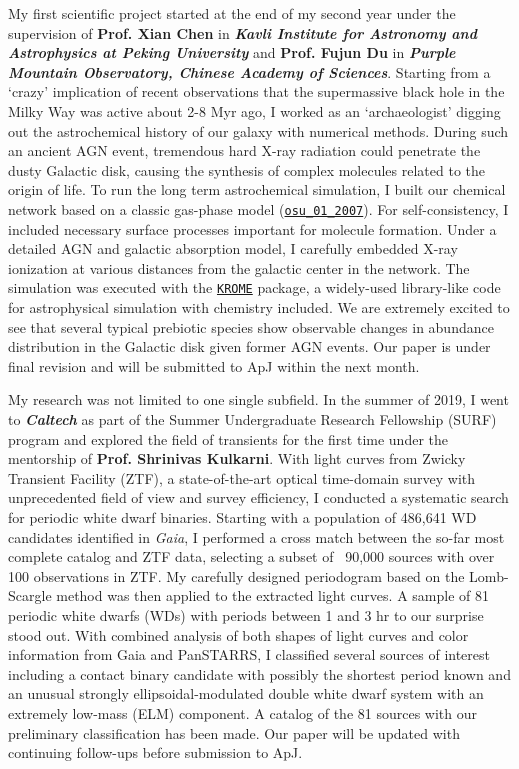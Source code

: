 My first scientific project started at the end of my second year under the supervision of \textbf{Prof. Xian Chen} in \textbf{\textit{Kavli Institute for Astronomy and Astrophysics at Peking University}} and \textbf{Prof. Fujun Du} in \textbf{\textit{Purple Mountain Observatory, Chinese Academy of Sciences}}. Starting from a `crazy' implication of recent observations that the supermassive black hole in the Milky Way was active about 2-8 Myr ago, I worked as an `archaeologist' digging out the astrochemical history of our galaxy with numerical methods. During such an ancient AGN event, tremendous hard X-ray radiation could penetrate the dusty Galactic disk, causing the synthesis of complex molecules related to the origin of life. To run the long term astrochemical simulation, I built our chemical network based on a classic gas-phase model (\href{http://faculty.virginia.edu/ericherb/research_files/osu_01_2007}{\texttt{osu\_01\_2007}}). For self-consistency, I included necessary surface processes important for molecule formation. Under a detailed AGN and galactic absorption model, I carefully embedded X-ray ionization at various distances from the galactic center in the network. The simulation was executed with the \href{http://kromepackage.org}{\texttt{KROME}} package, a widely-used library-like code for astrophysical simulation with chemistry included. We are extremely excited to see that several typical prebiotic species show observable changes in abundance distribution in the Galactic disk given former AGN events. Our paper is under final revision and will be submitted to ApJ within the next month.

My research was not limited to one single subfield. In the summer of 2019, I went to \textbf{\textit{Caltech}} as part of the Summer Undergraduate Research Fellowship (SURF) program and explored the field of transients for the first time under the mentorship of \textbf{Prof. Shrinivas Kulkarni}. With light curves from Zwicky Transient Facility (ZTF), a state-of-the-art optical time-domain survey with unprecedented field of view and survey efficiency, I conducted a systematic search for periodic white dwarf binaries. Starting with a population of 486,641 WD candidates identified in \textit{Gaia}, I performed a cross match between the so-far most complete catalog and ZTF data, selecting a subset of ~90,000 sources with over 100 observations in ZTF. My carefully designed periodogram based on the Lomb-Scargle method was then applied to the extracted light curves. A sample of 81 periodic white dwarfs (WDs) with periods between 1 and 3 hr to our surprise stood out. With combined analysis of both shapes of light curves and color information from Gaia and PanSTARRS, I classified several sources of interest including a contact binary candidate with possibly the shortest period known and an unusual strongly ellipsoidal-modulated double white dwarf system with an extremely low-mass (ELM) component. A catalog of the 81 sources with our preliminary classification has been made. Our paper will be updated with continuing follow-ups before submission to ApJ.

